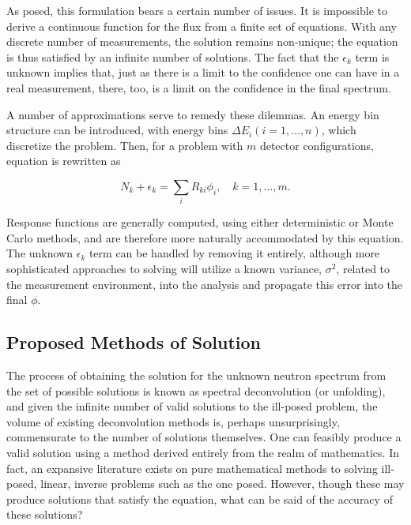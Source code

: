 As posed, this formulation bears a certain number of issues.
It is impossible to derive a continuous function for the flux from a finite set of equations.
With any discrete number of measurements, the solution remains non-unique; the equation is thus satisfied by an infinite number of solutions.
The fact that the $\epsilon_k$ term is unknown implies that, just as there is a limit to the confidence one can have in a real measurement, there, too, is a limit on the confidence in the final spectrum.

A number of approximations serve to remedy these dilemmas.
An energy bin structure can be introduced, with energy bins $\Delta E_i (i = 1, \ldots, n)$, which discretize the problem.
Then, for a problem with $m$ detector configurations, equation  is rewritten as

\begin{equation}
\label{eqn:disc-response}
N_k + \epsilon_k = \sum_i R_{ki} \phi_i, \quad k = 1,\ldots, m .
\end{equation}

Response functions are generally computed, using either deterministic or Monte Carlo methods, and are therefore more naturally accommodated by this equation.
The unknown $\epsilon_k$ term can be handled by removing it entirely, although more sophisticated approaches to solving will utilize a known variance, $\sigma^2$, related to the measurement environment, into the analysis and propagate this error into the final $\phi$.


\subsection{Proposed Methods of Solution}

The process of obtaining the solution for the unknown neutron spectrum from the set of possible solutions is known as spectral deconvolution (or unfolding), and given the infinite number of valid solutions to the ill-posed problem, the volume of existing deconvolution methods is, perhaps unsurprisingly, commensurate to the number of solutions themselves.
One can feasibly produce a valid solution using a method derived entirely from the realm of mathematics.
In fact, an expansive literature exists on pure mathematical methods to solving ill-posed, linear, inverse problems such as the one posed.
However, though these may produce solutions that satisfy the equation, what can be said of the accuracy of these solutions?


